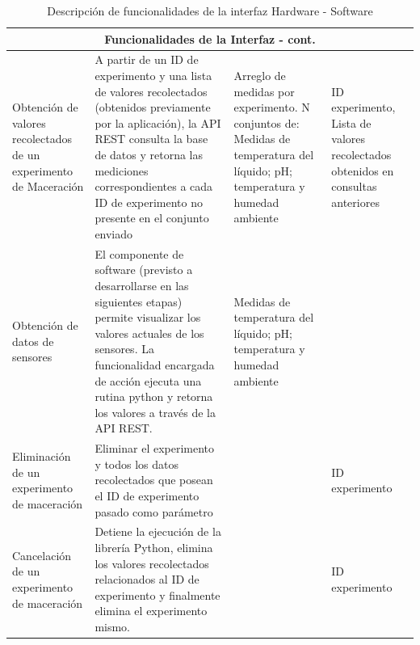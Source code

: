                 \begin{table}[H]
                \centering
                \begin{tabularx}{\textwidth}{|X|X|X|X|}
                    \hline
                    \multicolumn{4}{|c|}{\textbf{Funcionalidades de la Interfaz - cont.}} \\
                    \hline
                    Obtención de valores recolectados de un experimento de Maceración & A partir de un ID de experimento y una lista de valores recolectados (obtenidos previamente por la aplicación), la API REST consulta la base de datos y retorna las mediciones correspondientes a cada ID de experimento no presente en el conjunto enviado & Arreglo de medidas por experimento. N conjuntos de: Medidas de temperatura del líquido; pH; temperatura y humedad ambiente & ID experimento, Lista de valores recolectados obtenidos en consultas anteriores \\ 
                    \hline
                    
                    Obtención de datos de sensores & 
                    El componente de software (previsto a desarrollarse en las siguientes etapas) permite visualizar los valores actuales de los sensores. La funcionalidad encargada de acción ejecuta una rutina python y retorna los valores a través de la API REST. & Medidas de temperatura del líquido; pH; temperatura y humedad ambiente & \\
                    \hline
                    
                    Eliminación de un experimento de maceración & Eliminar el experimento y todos los datos recolectados que posean el ID de experimento pasado como parámetro &  & ID experimento\\
                    \hline
                    
                    Cancelación de un experimento de maceración & Detiene la ejecución de la librería Python, elimina los valores recolectados relacionados al ID de experimento y finalmente elimina el experimento mismo. & & ID experimento
                    \\
                    \hline
                    
                \end{tabularx}
                \caption{Descripción de funcionalidades de la interfaz Hardware - Software}
                \label{tab:FuncionalidadesInterfaz}
            \end{table}
    
